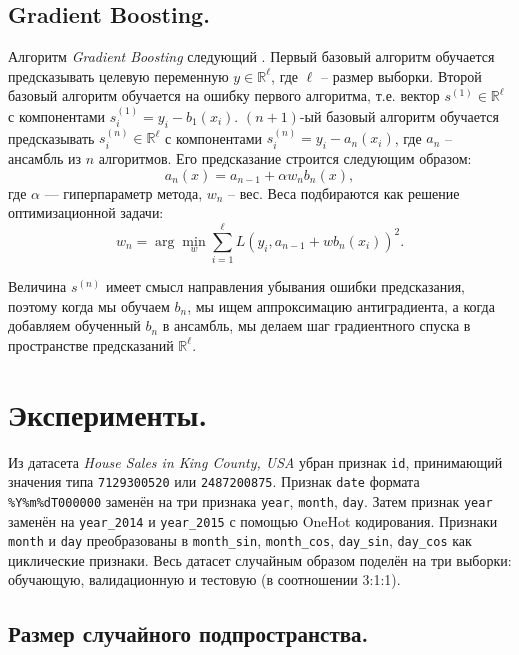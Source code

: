 \documentclass[12pt]{extarticle}
\newcommand{\R}{\mathbb{R}}
\begin{document}
\subsection{Gradient Boosting.}

Алгоритм \textit{Gradient Boosting} следующий \cite{adv}. Первый базовый алгоритм обучается предсказывать целевую переменную $y\in\R^\ell$, где $\ell$ -- размер выборки. Второй базовый алгоритм обучается на ошибку первого алгоритма, т.е. вектор $s^{(1)}\in\R^\ell$ с компонентами $s_i^{(1)}=y_i-b_1(x_i)$. $(n+1)$-ый базовый алгоритм обучается предсказывать $s_i^{(n)}\in\R^\ell$ с компонентами $s_i^{(n)}=y_i-a_n(x_i)$, где $a_n$ -- ансамбль из $n$ алгоритмов. Его предсказание строится следующим образом:
\begin{equation*}
    a_n(x)=a_{n-1}+\alpha w_nb_n(x),
\end{equation*}
где $\alpha$ --- гиперпараметр метода, $w_n$ -- вес. Веса подбираются как решение оптимизационной задачи:
\begin{equation*}
    w_n=\arg\min_w\sum_{i=1}^\ell L(y_i,a_{n-1}+wb_n(x_i))^2.
\end{equation*}

Величина $s^{(n)}$ имеет смысл направления убывания ошибки предсказания, поэтому когда мы обучаем $b_n$, мы ищем аппроксимацию антиградиента, а когда добавляем обученный $b_n$ в ансамбль, мы делаем шаг градиентного спуска в пространстве предсказаний $\R^\ell$.

\section{Эксперименты.}

Из датасета \textit{House Sales in King County, USA} убран признак \texttt{id}, принимающий значения типа \texttt{7129300520} или \texttt{2487200875}. Признак \texttt{date} формата \texttt{\%Y\%m\%dT000000} заменён на три признака \texttt{year}, \texttt{month}, \texttt{day}. Затем признак \texttt{year} заменён на \texttt{year\_2014} и \texttt{year\_2015} с помощью OneHot кодирования. Признаки \texttt{month} и \texttt{day} преобразованы в \texttt{month\_sin}, \texttt{month\_cos}, \texttt{day\_sin}, \texttt{day\_cos} как циклические признаки. Весь датасет случайным образом поделён на три выборки: обучающую, валидационную и тестовую (в соотношении 3:1:1).

\subsection{Размер случайного подпространства.} \label{sec:subspacesize}
\end{document}

